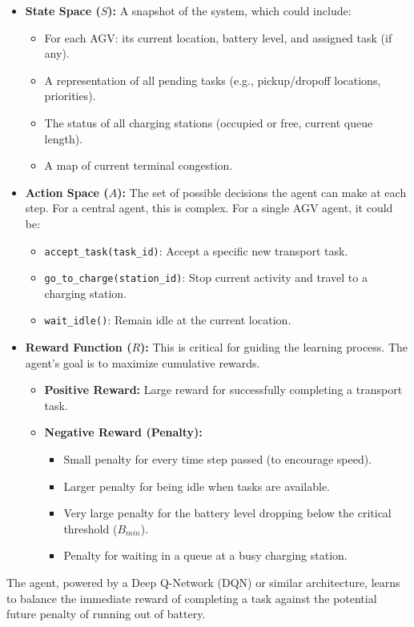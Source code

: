 \documentclass{article}
\begin{document}
\begin{itemize}
    \item \textbf{State Space ($S$):} A snapshot of the system, which could include:
        \begin{itemize}
            \item For each AGV: its current location, battery level, and assigned task (if any).
            \item A representation of all pending tasks (e.g., pickup/dropoff locations, priorities).
            \item The status of all charging stations (occupied or free, current queue length).
            \item A map of current terminal congestion.
        \end{itemize}
    \item \textbf{Action Space ($A$):} The set of possible decisions the agent can make at each step. For a central agent, this is complex. For a single AGV agent, it could be:
        \begin{itemize}
            \item \texttt{accept\_task(task\_id)}: Accept a specific new transport task.
            \item \texttt{go\_to\_charge(station\_id)}: Stop current activity and travel to a charging station.
            \item \texttt{wait\_idle()}: Remain idle at the current location.
        \end{itemize}
    \item \textbf{Reward Function ($R$):} This is critical for guiding the learning process. The agent's goal is to maximize cumulative rewards.
        \begin{itemize}
            \item \textbf{Positive Reward:} Large reward for successfully completing a transport task.
            \item \textbf{Negative Reward (Penalty):}
                \begin{itemize}
                    \item Small penalty for every time step passed (to encourage speed).
                    \item Larger penalty for being idle when tasks are available.
                    \item Very large penalty for the battery level dropping below the critical threshold ($B_{min}$).
                    \item Penalty for waiting in a queue at a busy charging station.
                \end{itemize}
        \end{itemize}
\end{itemize}
The agent, powered by a Deep Q-Network (DQN) or similar architecture, learns to balance the immediate reward of completing a task against the potential future penalty of running out of battery.
\end{document}
